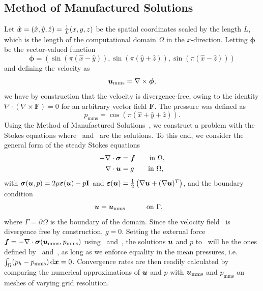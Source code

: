 \documentclass{WileyMSP-template}
\begin{document}
\subsection{Method of Manufactured Solutions}\label{subsec:mms}
Let $\hat{\bm{x}} = (\hat{x}, \hat{y}, \hat{z}) = \frac{1}{L}(x, y, z)$
be the spatial coordinates scaled by the length $L$, which is the length of
the computational domain $\Omega$ in the $x$-direction. Letting $\bm{\phi}$ be
the vector-valued function
\begin{equation*}
    \bm{\phi} = \left(\sin{(\pi(\hat{x} - \hat{y}))},
    \sin{(\pi(\hat{y} + \hat{z}))},
    \sin{(\pi(\hat{x} - \hat{z}))}\right)
\end{equation*}
and defining the velocity as 
\begin{equation}
    \bm{u}_{\mathrm{mms}} = \nabla\times\bm{\phi},
    \label{eq:velocity_mms}
\end{equation}
we have by construction that the velocity is divergence-free,
owing to the identity $\nabla\cdot(\nabla\times\bm{F}) = 0$ for
an arbitrary vector field $\bm{F}$. The pressure was defined as
\begin{equation}
    p_{\mathrm{mms}} = \cos{(\pi(\hat{x} + \hat{y} + \hat{z}))}.
    \label{eq:pressure_mms}
\end{equation}
Using the Method of Manufactured Solutions~\cite{Roache2001CodeSolutions},
we construct a problem with the Stokes equations where~
and~ are the solutions.
To this end, we consider the general form of the steady Stokes equations
\begin{subequations}
    \begin{align}
        -\nabla\cdot\bm{\sigma} &= \bm{f} \qquad\mathrm{in \ }\Omega,\\
        \nabla\cdot\bm{u} &= g \qquad\mathrm{in \ }\Omega,
    \end{align}
    \label{eq:stokes_mms}%
\end{subequations}%
with $\bm{\sigma}(\bm{u}, p) = 2\mu\bm{\varepsilon}(\bm{u}) - p\mathbf{I}$ and
$\bm{\varepsilon}(\bm{u}) = \frac{1}{2}\left(\nabla\bm{u} + (\nabla\bm{u})^T\right)$, and the boundary condition
\begin{alignat}{2}
    \bm{u} &= \bm{u}_{\mathrm{mms}} \qquad&&\mathrm{on \ }\Gamma,
\end{alignat}
where $\Gamma=\partial\Omega$ is the boundary of the domain.
Since the velocity field~ is divergence free by construction,
$g = 0$. Setting the external force $\bm{f}=-\nabla\cdot\bm{\sigma}(\bm{u}_{\mathrm{mms}}, p_{\mathrm{mms}})$
using~ and~,
the solutions $\bm{u}$ and $p$ to~ will be the ones
defined by~ and~,
as long as we enforce equality in the mean pressures, i.e. $\int_{\Omega}(p_h - p_{\mathrm{mms}}) \, \mathrm d\bm{x}=0$.
Convergence rates are then readily calculated by comparing the numerical approximations of
$\bm{u}$ and $p$ with $\bm{u}_{\mathrm{mms}}$ and $p_{\mathrm{mms}}$
on meshes of varying grid resolution.
\end{document}
